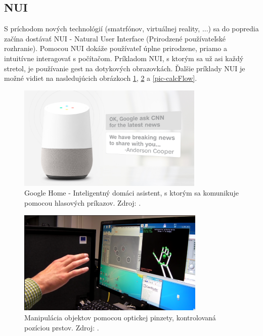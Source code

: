 \subsection{NUI}
S príchodom nových technológií (smatrfónov, virtuálnej reality, ...) sa do popredia začína dostávať NUI - Natural User Interface (Prirodzené používateľské rozhranie).
Pomocou NUI dokáže používateľ úplne prirodzene, priamo a intuitívne interagovať s počítačom.
Príkladom NUI, s ktorým sa už asi každý stretol, je používanie gest na dotykových obrazovkách.
Ďalšie príklady NUI je možné vidiet na nasledujúcich obrázkoch \ref{pic-GoogleHome}, \ref{pic-Microrobotics} a \ref{pic-calcFlow}.

\begin{figure}[H]
	\begin{center}
		\includegraphics[height=5cm]{pics/googleHome.jpg}
		\caption{Google Home - Inteligentný domáci asistent, s ktorým sa komunikuje pomocou hlasových príkazov.
		Zdroj: \cite{GoogleHome}.}
		\label{pic-GoogleHome}
	\end{center}
\end{figure}

\begin{figure}[H]
	\begin{center}
		\includegraphics[height=5cm]{pics/Microrobotics.png}
		\caption{Manipulácia objektov pomocou optickej pinzety, kontrolovaná pozíciou prstov. 
		Zdroj: \cite{Microrobotics}.}
		\label{pic-Microrobotics}
	\end{center}
\end{figure}

